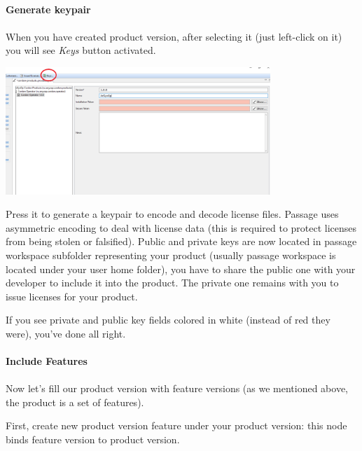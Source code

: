 \documentclass[12pt]{report}
\begin{document}
\paragraph*{Generate keypair}
\paragraph*{}

When you have created product version, after selecting it (just left-click on it) you will see \textit{Keys} button activated. 

\begin{center}
    \includegraphics[width=0.75\textwidth]{product_version_keys}
\end{center}

Press it to generate a keypair to encode and decode license files.
Passage uses asymmetric encoding to deal with license data (this is required to protect licenses from being stolen or falsified). Public and private keys are now located in passage workspace subfolder representing your product
(usually passage workspace is located under your user home folder), you have to share the public one with your developer to include it into the product. The private one remains with you to issue
licenses for your product.

If you see private and public key fields colored in white (instead of red they were), you've done all right.

\paragraph*{Include Features}
\paragraph*{}

Now let's fill our product version with feature versions (as we mentioned above, the product is a set of features).

First, create new product version feature under your product version: this node binds feature version to product version.
\end{document}
